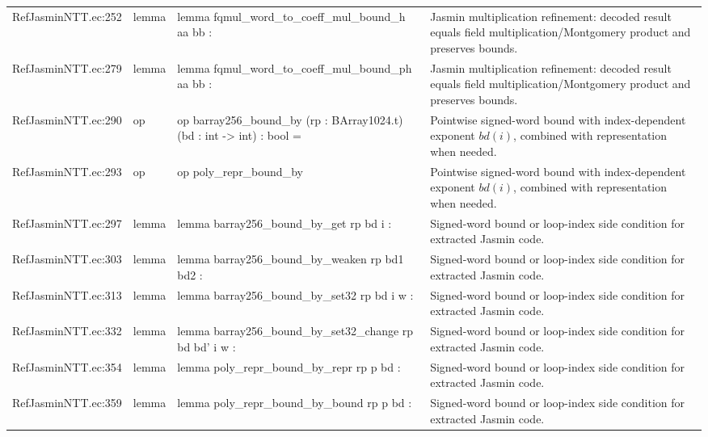 \documentclass[10pt]{article}
\begin{document}
\begin{longtable}{L{0.11\textwidth}L{0.05\textwidth}L{0.38\textwidth}L{0.42\textwidth}}
RefJasminNTT.\allowbreak{}ec:\allowbreak{}252 & lemma & {\ttfamily\scriptsize lemma fqmul\_word\_to\_coeff\_mul\_bound\_h aa bb :} & Jasmin multiplication refinement: decoded result equals field multiplication/Montgomery product and preserves bounds. \\
RefJasminNTT.\allowbreak{}ec:\allowbreak{}279 & lemma & {\ttfamily\scriptsize lemma fqmul\_word\_to\_coeff\_mul\_bound\_ph aa bb :} & Jasmin multiplication refinement: decoded result equals field multiplication/Montgomery product and preserves bounds. \\
RefJasminNTT.\allowbreak{}ec:\allowbreak{}290 & op & {\ttfamily\scriptsize op barray256\_bound\_by (rp : BArray1024.t) (bd : int -> int) : bool =} & Pointwise signed-word bound with index-dependent exponent $bd(i)$, combined with representation when needed. \\
RefJasminNTT.\allowbreak{}ec:\allowbreak{}293 & op & {\ttfamily\scriptsize op poly\_repr\_bound\_by} & Pointwise signed-word bound with index-dependent exponent $bd(i)$, combined with representation when needed. \\
RefJasminNTT.\allowbreak{}ec:\allowbreak{}297 & lemma & {\ttfamily\scriptsize lemma barray256\_bound\_by\_get rp bd i :} & Signed-word bound or loop-index side condition for extracted Jasmin code. \\
RefJasminNTT.\allowbreak{}ec:\allowbreak{}303 & lemma & {\ttfamily\scriptsize lemma barray256\_bound\_by\_weaken rp bd1 bd2 :} & Signed-word bound or loop-index side condition for extracted Jasmin code. \\
RefJasminNTT.\allowbreak{}ec:\allowbreak{}313 & lemma & {\ttfamily\scriptsize lemma barray256\_bound\_by\_set32 rp bd i w :} & Signed-word bound or loop-index side condition for extracted Jasmin code. \\
RefJasminNTT.\allowbreak{}ec:\allowbreak{}332 & lemma & {\ttfamily\scriptsize lemma barray256\_bound\_by\_set32\_change rp bd bd' i w :} & Signed-word bound or loop-index side condition for extracted Jasmin code. \\
RefJasminNTT.\allowbreak{}ec:\allowbreak{}354 & lemma & {\ttfamily\scriptsize lemma poly\_repr\_bound\_by\_repr rp p bd :} & Signed-word bound or loop-index side condition for extracted Jasmin code. \\
RefJasminNTT.\allowbreak{}ec:\allowbreak{}359 & lemma & {\ttfamily\scriptsize lemma poly\_repr\_bound\_by\_bound rp p bd :} & Signed-word bound or loop-index side condition for extracted Jasmin code. \\

\end{longtable}
\end{document}
